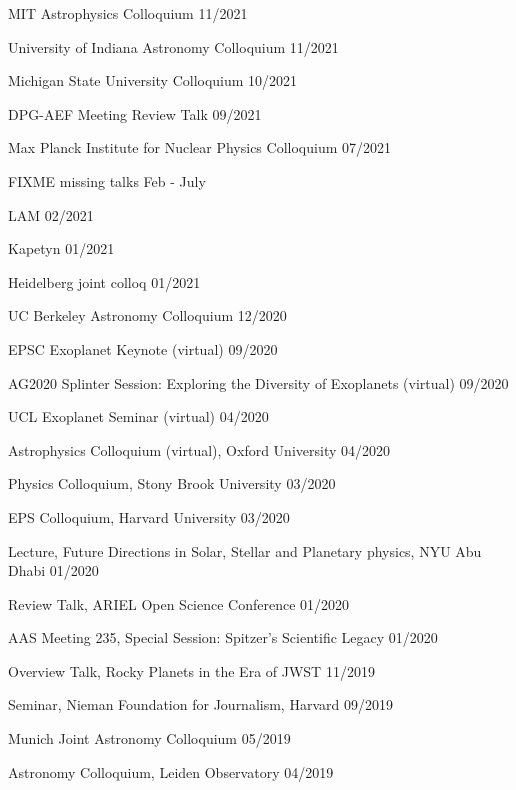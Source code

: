 \documentclass[12pt,letterpaper]{article}
\begin{document}
\begin{list}{}{\cvlist}


\end{list}

\begin{list}{}{\cvlist}
\item {MIT Astrophysics Colloquium \hfill 11/2021}
\item {University of Indiana Astronomy Colloquium \hfill 11/2021}
\item {Michigan State University Colloquium \hfill 10/2021}
\item {DPG-AEF Meeting Review Talk \hfill  09/2021}
\item {Max Planck Institute for Nuclear Physics Colloquium \hfill 07/2021}
\item {FIXME missing talks Feb - July}
\item {LAM \hfill 02/2021}
\item {Kapetyn \hfill 01/2021}
\item {Heidelberg joint colloq 01/2021}
\item {UC Berkeley Astronomy Colloquium \hfill 12/2020}
\item {EPSC Exoplanet Keynote (virtual) \hfill 09/2020}
\item {AG2020 Splinter Session: Exploring the Diversity of Exoplanets (virtual) \hfill 09/2020}
\item {UCL Exoplanet Seminar (virtual) \hfill 04/2020}
\item {Astrophysics Colloquium (virtual), Oxford University \hfill 04/2020}
\item {Physics Colloquium, Stony Brook University \hfill 03/2020}
\item {EPS Colloquium, Harvard University \hfill 03/2020}
\item {Lecture, Future Directions in Solar, Stellar and Planetary physics, NYU Abu Dhabi \hfill 01/2020}
\item {Review Talk, ARIEL Open Science Conference \hfill 01/2020} 
\item {AAS Meeting 235, Special Session: Spitzer's Scientific Legacy \hfill 01/2020}
\item {Overview Talk, Rocky Planets in the Era of JWST \hfill 11/2019}
\item {Seminar, Nieman Foundation for Journalism, Harvard \hfill 09/2019}
\item {Munich Joint Astronomy Colloquium \hfill 05/2019}
\item {Astronomy Colloquium, Leiden Observatory \hfill 04/2019}

\end{list}
\end{document}
